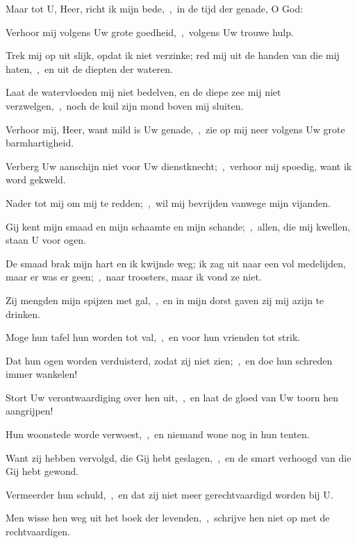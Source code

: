 \documentclass[12pt,twoside,a5paper]{article}
\begin{document}

\begin{halfparskip}
  Maar tot U, Heer, richt ik mijn bede,~\sep\ in de tijd der genade, O God:

  Verhoor mij volgens Uw grote goedheid,~\sep\ volgens Uw trouwe hulp.

  Trek mij op uit slijk, opdat ik niet verzinke; red mij uit de handen van die mij haten,~\sep\ en uit de diepten der wateren.

  Laat de watervloeden mij niet bedelven, en de diepe zee mij niet verzwelgen,~\sep\ noch de kuil zijn mond boven mij sluiten.

  Verhoor mij, Heer, want mild is Uw genade,~\sep\ zie op mij neer volgens Uw grote barmhartigheid.

  Verberg Uw aanschijn niet voor Uw dienstknecht;~\sep\ verhoor mij spoedig, want ik word gekweld.

  Nader tot mij om mij te redden;~\sep\ wil mij bevrijden vanwege mijn vijanden.

  Gij kent mijn smaad en mijn schaamte en mijn schande;~\sep\ allen, die mij kwellen, staan U voor ogen.

  De smaad brak mijn hart en ik kwijnde weg; ik zag uit naar een vol medelijden, maar er was er geen;~\sep\ naar troosters, maar ik vond ze niet.

  Zij mengden mijn spijzen met gal,~\sep\ en in mijn dorst gaven zij mij azijn te drinken.
\end{halfparskip}


\begin{halfparskip}
  Moge hun tafel hun worden tot val,~\sep\ en voor hun vrienden tot strik.

  Dat hun ogen worden verduisterd, zodat zij niet zien;~\sep\ en doe hun schreden immer wankelen!

  Stort Uw verontwaardiging over hen uit,~\sep\ en laat de gloed van Uw toorn hen aangrijpen!

  Hun woonstede worde verwoest,~\sep\ en niemand wone nog in hun tenten.

  Want zij hebben vervolgd, die Gij hebt geslagen,~\sep\ en de smart verhoogd van die Gij hebt gewond.

  Vermeerder hun schuld,~\sep\ en dat zij niet meer gerechtvaardigd worden bij U.

  Men wisse hen weg uit het boek der levenden,~\sep\ schrijve hen niet op met de rechtvaardigen.
\end{halfparskip}
\end{document}
